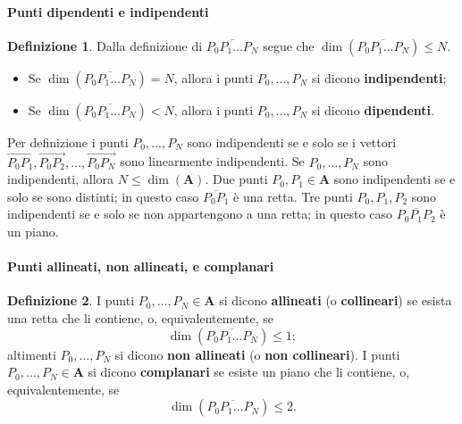 \documentclass{article}
\theoremstyle{plain}
\theoremstyle{definition}
\newtheorem{defn}{Definizione}[section]
\theoremstyle{remark}
\begin{document}
\paragraph{Punti dipendenti e indipendenti}
\begin{bxthm}
\begin{defn}
    Dalla definizione di $\overline{P_0P_1\dots P_N}$ segue che $\dim(\overline{P_0P_1\dots P_N})\leq N$. 
    \begin{itemize}
        \item Se $\dim(\overline{P_0P_1\dots P_N})=N$, allora i punti $P_0,\dots, P_N$ si dicono \textbf{indipendenti};
        \item Se $\dim(\overline{P_0P_1\dots P_N})<N$, allora i punti $P_0,\dots, P_N$ si dicono \textbf{dipendenti}.
    \end{itemize}Per definizione i punti $P_0,\dots, P_N$ sono indipendenti se e solo se i vettori $\overrightarrow{P_0P_1},\overrightarrow{P_0P_2},\dots,\overrightarrow{P_0P_N}$ sono linearmente indipendenti. 
    Se $P_0,\dots,P_N$ sono indipendenti, allora $N\leq\dim(\mathbf{A})$.
    Due punti $P_0,P_1\in\mathbf{A}$ sono indipendenti se e solo se sono distinti; in questo caso $\overline{P_0P_1}$ è una retta. 
    Tre punti $P_0,P_1,P_2$ sono indipendenti se e solo se non appartengono a una retta; in questo caso $\overline{P_0P_1P_2}$ è un piano.
\end{defn}
\end{bxthm}

\vspace{10pt}

\paragraph{Punti allineati, non allineati, e complanari}
\begin{bxthm}
\begin{defn}
    I punti $P_0,\dots,P_N\in\mathbf{A}$ si dicono \textbf{allineati} (o \textbf{collineari}) se esista una retta che li contiene, o, equivalentemente, se
    \[\dim(\overline{P_0P_1\dots P_N})\leq1;\]
    altimenti $P_0,\dots,P_N$ si dicono \textbf{non allineati} (o \textbf{non collineari}).
    I punti $P_0,\dots,P_N\in\mathbf{A}$ si dicono \textbf{complanari} se esiste un piano che li contiene, o, equivalentemente, se 
    \[\dim(\overline{P_0P_1\dots P_N})\leq2.\]
\end{defn}
\end{bxthm}

\vspace{10pt}
\end{document}
